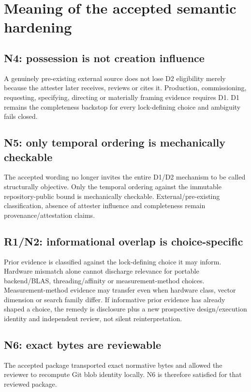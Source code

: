 \documentclass[10pt,a4paper]{article}
\begin{document}
\section{Meaning of the accepted semantic hardening}

\subsection*{N4: possession is not creation influence}

A genuinely pre-existing external source does not lose D2 eligibility merely because the attester later receives,
reviews or cites it. Production, commissioning, requesting, specifying, directing or materially framing evidence
requires D1. D1 remains the completeness backstop for every lock-defining choice and ambiguity fails closed.

\subsection*{N5: only temporal ordering is mechanically checkable}

The accepted wording no longer invites the entire D1/D2 mechanism to be called structurally objective. Only the temporal
ordering against the immutable repository-public bound is mechanically checkable. External/pre-existing classification,
absence of attester influence and completeness remain provenance/attestation claims.

\subsection*{R1/N2: informational overlap is choice-specific}

Prior evidence is classified against the lock-defining choice it may inform. Hardware mismatch alone cannot discharge
relevance for portable backend/BLAS, threading/affinity or measurement-method choices. Measurement-method evidence may
transfer even when hardware class, vector dimension or search family differ. If informative prior evidence has already
shaped a choice, the remedy is disclosure plus a new prospective design/execution identity and independent review, not
silent reinterpretation.

\subsection*{N6: exact bytes are reviewable}

The accepted package transported exact normative bytes and allowed the reviewer to recompute Git blob identity locally.
N6 is therefore satisfied for that reviewed package.
\end{document}

